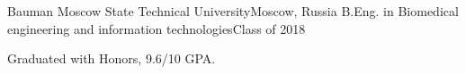 \resumeSubheading
{Bauman Moscow State Technical University}{Moscow, Russia}
{B.Eng. in Biomedical engineering and information technologies}{Class of 2018}
\begin{itemize}[leftmargin=0in, label={}]
    \small{\item{
        {Graduated with Honors, 9.6/10 GPA.}\\
    }}
\end{itemize}
